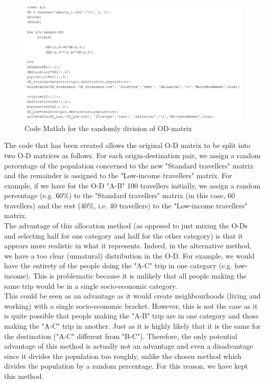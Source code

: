 \documentclass[a4paper, 12pt,oneside]{article}
\begin{document}
\begin{figure}[H]
    \centering
    \includegraphics[width=1.0\textwidth]{Images/Step3/Code task 3.png}
    \caption{Code Matlab for the randomly division of OD-matrix}
    \label{fig:Code Matlab for the randomly division of OD-matrix}
\end{figure}

The code that has been created allows the original O-D matrix to be split into two O-D matrices as follows. For each origin-destination pair, we assign a random percentage of the population concerned to the new "Standard travellers" matrix and the remainder is assigned to the "Low-income travellers" matrix. For example, if we have for the O-D "A-B" 100 travellers initially, we assign a random percentage (e.g. 60\%) to the "Standard travellers" matrix (in this case, 60 travellers) and the rest (40\%, i.e. 40 travellers) to the "Low-income travellers" matrix.\\

The advantage of this allocation method (as opposed to just mixing the O-Ds and selecting half for one category and half for the other category) is that it appears more realistic in what it represents. Indeed, in the alternative method, we have a too clear (unnatural) distribution in the O-D. For example, we would have the entirety of the people doing the "A-C" trip in one category (e.g. low-income). This is problematic because it is unlikely that all people making the same trip would be in a single socio-economic category.\\

This could be seen as an advantage as it would create neighbourhoods (living and working) with a single socio-economic bracket. However, this is not the case as it is quite possible that people making the "A-B" trip are in one category and those making the "A-C" trip in another. Just as it is highly likely that it is the same for the destination ("A-C" different from "B-C"). Therefore, the only potential advantage of this method is actually not an advantage and even a disadvantage since it divides the population too roughly, unlike the chosen method which divides the population by a random percentage. For this reason, we have kept this method.\\
\end{document}
